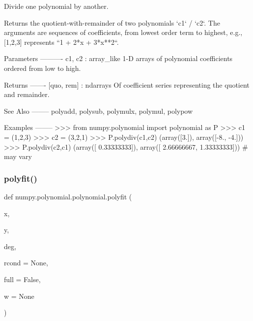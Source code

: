 \begin{DoxyVerb}Divide one polynomial by another.

Returns the quotient-with-remainder of two polynomials `c1` / `c2`.
The arguments are sequences of coefficients, from lowest order term
to highest, e.g., [1,2,3] represents ``1 + 2*x + 3*x**2``.

Parameters
----------
c1, c2 : array_like
    1-D arrays of polynomial coefficients ordered from low to high.

Returns
-------
[quo, rem] : ndarrays
    Of coefficient series representing the quotient and remainder.

See Also
--------
polyadd, polysub, polymulx, polymul, polypow

Examples
--------
>>> from numpy.polynomial import polynomial as P
>>> c1 = (1,2,3)
>>> c2 = (3,2,1)
>>> P.polydiv(c1,c2)
(array([3.]), array([-8., -4.]))
>>> P.polydiv(c2,c1)
(array([ 0.33333333]), array([ 2.66666667,  1.33333333])) # may vary\end{DoxyVerb}
 \mbox{\label{namespacenumpy_1_1polynomial_1_1polynomial_a130d0c55e30505c68f062a2f7ce31c76}} 
\subsubsection{\texorpdfstring{polyfit()}{polyfit()}}
{\footnotesize\ttfamily def numpy.\+polynomial.\+polynomial.\+polyfit (\begin{DoxyParamCaption}\item[{}]{x,  }\item[{}]{y,  }\item[{}]{deg,  }\item[{}]{rcond = {\ttfamily None},  }\item[{}]{full = {\ttfamily False},  }\item[{}]{w = {\ttfamily None} }\end{DoxyParamCaption})}

